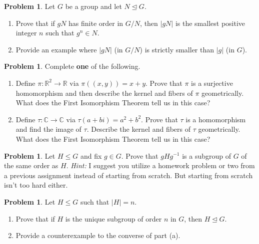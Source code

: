 \documentclass[11pt]{scrartcl}
\theoremstyle{definition}
\newtheorem{problem}[theorem]{Problem}
\begin{document}
\begin{problem}
Let $G$ be a group and let $N\unlhd G$. 
\begin{enumerate}[label=\rm{(\alph*)}]
\item Prove that if $gN$ has finite order in $G/N$, then $|gN|$ is the smallest positive integer $n$ such that $g^n\in N$.
\item Provide an example where $|gN|$ (in $G/N$) is strictly smaller than $|g|$ (in $G$).
\end{enumerate}
\end{problem}

\newpage

\begin{problem}
Complete \textbf{one} of the following.
\begin{enumerate}[label=\rm{(\alph*)}]
\item Define $\pi:\mathbb{R}^2\to \mathbb{R}$ via $\pi((x,y))=x+y$.  Prove that $\pi$ is a surjective homomorphism and then describe the kernel and fibers of $\pi$ geometrically.  What does the First Isomorphism Theorem tell us in this case?
\item Define $\tau:\mathbb{C}\to\mathbb{C}$ via $\tau(a+bi)=a^2+b^2$. Prove that $\tau$ is a homomorphism and find the image of $\tau$.  Describe the kernel and fibers of $\tau$ geometrically.  What does the First Isomorphism Theorem tell us in this case?
\end{enumerate}
\end{problem}

\begin{problem}
Let $H\leq G$ and fix $g\in G$. Prove that $gHg^{-1}$ is a subgroup of $G$ of the same order as $H$. \emph{Hint:} I suggest you utilize a homework problem or two from a previous assignment instead of starting from scratch.  But starting from scratch isn't too hard either.
\end{problem}

\begin{problem}
Let $H\leq G$ such that $|H|=n$. 
\begin{enumerate}[label=\rm{(\alph*)}]
\item Prove that if $H$ is the unique subgroup of order $n$ in $G$, then $H\unlhd G$.
\item Provide a counterexample to the converse of part (a).
\end{enumerate}
\end{problem}
\end{document}
